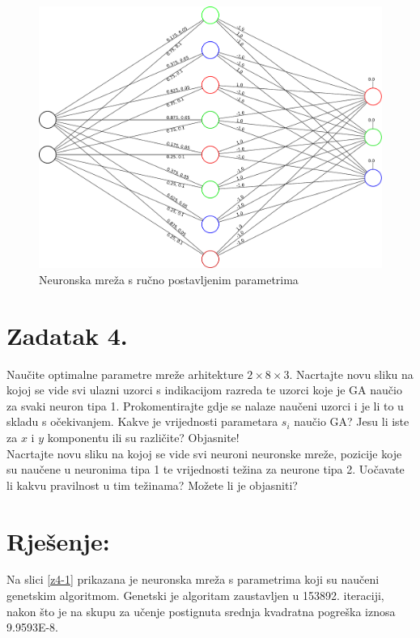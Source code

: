 \documentclass{article}
\begin{document}
\begin{figure}
    \centering
    \includegraphics[width=\textwidth]
    {img/task3-neural-network.pdf}
    \caption{Neuronska mreža s ručno postavljenim parametrima}
    \label{z3-1}
\end{figure}

\pagebreak

\section*{Zadatak 4.}
Naučite optimalne parametre mreže arhitekture
$ 2 \times 8 \times 3 $. Nacrtajte novu sliku na kojoj se
vide svi ulazni uzorci s indikacijom razreda te uzorci koje
je GA naučio za svaki neuron tipa 1. Prokomentirajte gdje se
nalaze naučeni uzorci i je li to u skladu s očekivanjem.
Kakve je vrijednosti parametara $ s_i $ naučio GA? Jesu li
iste za $ x $ i $ y $ komponentu ili su različite?
Objasnite!\\
Nacrtajte novu sliku na kojoj se vide svi neuroni neuronske
mreže, pozicije koje su naučene u neuronima tipa 1 te
vrijednosti težina za neurone tipa 2. Uočavate li kakvu
pravilnost u tim težinama? Možete li je objasniti?

\section*{Rješenje:}
Na slici \ref{z4-1} prikazana je neuronska mreža s
parametrima koji su naučeni genetskim algoritmom. Genetski je
algoritam zaustavljen u 153892. iteraciji, nakon što je na
skupu za učenje postignuta srednja kvadratna pogreška iznosa
9.9593E-8.
\end{document}

